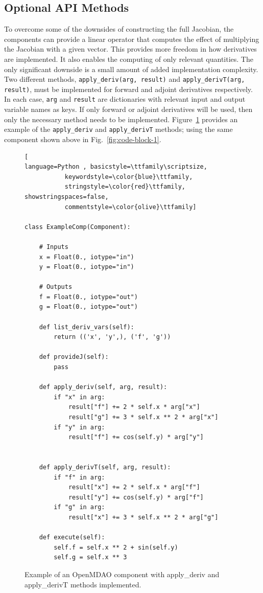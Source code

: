 \documentclass[]{aiaa-tc} %
\begin{document}
    \subsection{Optional API Methods}

        To overcome some of the downsides of constructing the full Jacobian, the components can provide
        a linear operator that computes the effect of multiplying the Jacobian with a given vector. This provides
        more freedom in how derivatives are implemented. It also enables the computing of only
        relevant quantities. The only significant downside is a small amount of added implementation complexity.
        Two different methods, \texttt{apply\_deriv(arg, result)} and \texttt{apply\_derivT(arg, result)}, must be implemented
        for forward and adjoint derivatives respectively. In each case, \texttt{arg} and \texttt{result}
        are dictionaries with relevant input and output variable names as keys.
        If only forward or adjoint derivatives will be used, then only the necessary method needs to be implemented. Figure~\ref{code:component_with_apply_deriv} provides an example of
        the \texttt{apply\_deriv} and \texttt{apply\_derivT} methods; using the same component shown above in
        Fig.~\ref{fig:code-block-1}.


\begin{figure}
\begin{minipage}{\textwidth}
\begin{lstlisting}[
language=Python , basicstyle=\ttfamily\scriptsize,
           keywordstyle=\color{blue}\ttfamily,
           stringstyle=\color{red}\ttfamily, showstringspaces=false,
           commentstyle=\color{olive}\ttfamily]

class ExampleComp(Component):

    # Inputs
    x = Float(0., iotype="in")
    y = Float(0., iotype="in")

    # Outputs
    f = Float(0., iotype="out")
    g = Float(0., iotype="out")

    def list_deriv_vars(self):
        return (('x', 'y',), ('f', 'g'))

    def provideJ(self):
        pass

    def apply_deriv(self, arg, result):
        if "x" in arg:
            result["f"] += 2 * self.x * arg["x"]
            result["g"] += 3 * self.x ** 2 * arg["x"]
        if "y" in arg:
            result["f"] += cos(self.y) * arg["y"]


    def apply_derivT(self, arg, result):
        if "f" in arg:
            result["x"] += 2 * self.x * arg["f"]
            result["y"] += cos(self.y) * arg["f"]
        if "g" in arg:
            result["x"] += 3 * self.x ** 2 * arg["g"]

    def execute(self):
        self.f = self.x ** 2 + sin(self.y)
        self.g = self.x ** 3

\end{lstlisting}
\caption{Example of an OpenMDAO
component with apply\_deriv and apply\_derivT methods implemented.
\label{code:component_with_apply_deriv}}
\end{minipage}

\end{figure}
\end{document}
